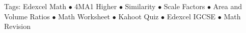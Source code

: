 \documentclass[11pt,a4paper]{article}
\begin{document}
\vspace{14pt}
\begin{center}
  \sffamily\scriptsize\textcolor{textmuted}{
    Tags: Edexcel Math $\bullet$ 4MA1 Higher $\bullet$ Similarity $\bullet$ Scale Factors $\bullet$ Area and Volume Ratios $\bullet$ Math Worksheet $\bullet$ Kahoot Quiz $\bullet$ Edexcel IGCSE $\bullet$ Math Revision
  }
\end{center}
\end{document}

